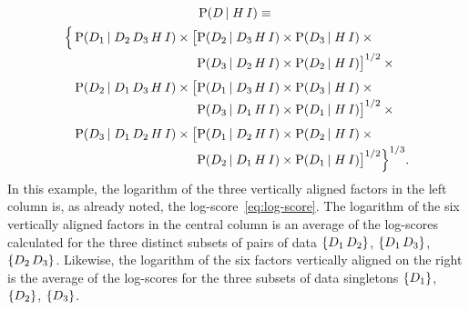 \documentclass[\ifafour a4paper,12pt,\else a5paper,10pt,\fi%
onecolumn,oneside,article,%
british%
]{memoir}
\theoremstyle{remark}
\theoremstyle{innote}
\DeclarePairedDelimiter\set{\{}{\}}
\newcommand*{\p}{\mathrm{P}}%
\renewcommand*{\|}[1][]{\nonscript\,#1\vert\nonscript\;\mathopen{}}
\newcommand*{\yK}{I}
\begin{document}
\begin{multline}
  \label{eq:example_further_expansion}
  \p(D \| H \, \yK) \equiv{}\\
  \begin{alignedat}[b]{2}
    \Bigl\{\,&\p(D_{1} \| D_{2} \,D_{3} \, H \, \yK) \times
    \bigl[ &&\p(D_{2} \| D_{3} \, H \, \yK) \times \p( D_{3} \| H \, \yK) \times{}\\[-0.5\jot]
    &&&\p(D_{3} \| D_{2} \, H \, \yK) \times \p( D_{2} \| H \, \yK)
    \bigr]^{1/2}\times{}\\[\jot]
    &\p(D_{2} \| D_{1} \,D_{3} \, H \, \yK) \times
    \bigl[&&\p(D_{1} \| D_{3} \, H \, \yK) \times \p( D_{3} \| H \, \yK) \times{}\\[-0.5\jot]
    &&&\p(D_{3} \| D_{1} \, H \, \yK) \times \p( D_{1} \| H \, \yK)
    \bigr]^{1/2}\times{}\\[\jot]
    &\p(D_{3} \| D_{1} \,D_{2} \, H \, \yK) \times
    \bigl[&&\p(D_{1} \| D_{2} \, H \, \yK) \times \p( D_{2} \| H \, \yK) \times{}\\[-0.5\jot]
    &&&\p(D_{2} \| D_{1} \, H \, \yK) \times \p( D_{1} \| H \, \yK)
    \bigr]^{1/2}\Bigr\}^{1/3}.
  \end{alignedat}
\end{multline}
In this example, the logarithm of the three vertically aligned factors in
the left column is, as already noted, the log-score~\eqref{eq:log-score}.
The logarithm of the six vertically aligned factors in the central column
is an average of the log-scores calculated for the three distinct subsets
of pairs of data $\set{D_{1}\,D_{2}}$, $\set{D_{1}\, D_{3}}$,
$\set{D_{2}\, D_{3}}$. Likewise, the logarithm of the six factors
vertically aligned on the right is the average of the log-scores for the
three subsets of data singletons $\set{D_{1}}$, $\set{D_{2}}$,
$\set{D_{3}}$.
\end{document}
